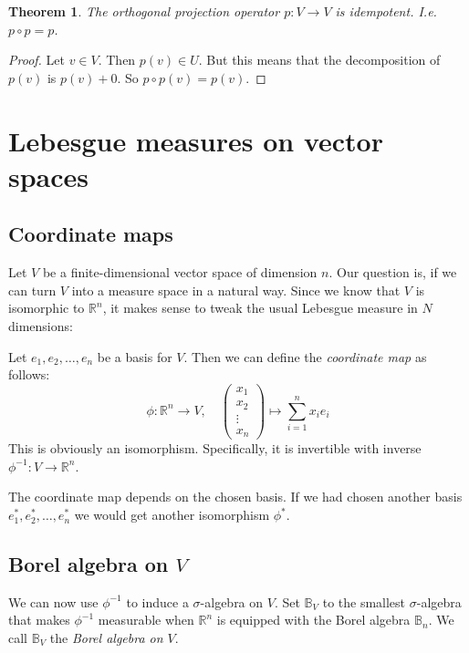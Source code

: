 \documentclass[12pt, a4paper]{article}
\newtheorem{theorem}{Theorem}[section]
\numberwithin{equation}{section}
\begin{document}
\begin{theorem}
The orthogonal projection operator $p:V\rightarrow V$ is idempotent. I.e. $p\circ p=p$.
\end{theorem}
\begin{proof}
Let $v\in V$. Then $p(v)\in U$. But this means that the decomposition of $p(v)$ is $p(v)+0$. So $p\circ p(v)=p(v)$.
\end{proof}

\section{Lebesgue measures on vector spaces}

\subsection{Coordinate maps}
Let $V$ be a finite-dimensional vector space of dimension $n$. Our question is, if we can turn $V$ into a measure space in a natural way. Since we know that $V$ is isomorphic to $\mathbb{R}^n$, it makes sense to tweak the usual Lebesgue measure in $N$ dimensions:

Let $e_1,e_2,\ldots,e_n$ be a basis for $V$. Then we can define the \textit{coordinate map} as follows:
\begin{equation}
\phi:\mathbb{R}^n\rightarrow V,\quad
\begin{pmatrix}
x_1	\\	x_2	\\ \vdots	\\ x_n
\end{pmatrix}
\mapsto\sum_{i=1}^n x_i e_i
\end{equation}
This is obviously an isomorphism. Specifically, it is invertible with inverse $\phi^{-1}: V\rightarrow\mathbb{R}^n$.

The coordinate map depends on the chosen basis. If we had chosen another basis $e^*_1,e^*_2,\ldots,e^*_n$ we would get another isomorphism $\phi^*$.

\subsection{Borel algebra on $V$}
We can now use $\phi^{-1}$ to induce a $\sigma$-algebra on $V$. Set $\mathbb{B}_V$ to the smallest $\sigma$-algebra that makes $\phi^{-1}$ measurable when $\mathbb{R}^n$ is equipped with the Borel algebra $\mathbb{B}_n$. We call $\mathbb{B}_V$ the \textit{Borel algebra on $V$}.
\end{document}
